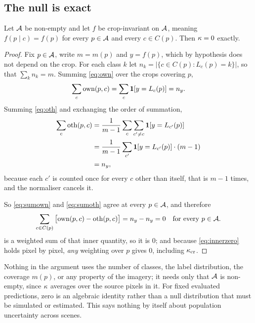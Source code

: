 \subsection{The null is exact}

\begin{proposition}
\label{prop:null}
Let $\mathcal{A}$ be non-empty and let $f$ be crop-invariant on $\mathcal{A}$, meaning
$f(p \mid c) = f(p)$ for every $p \in \mathcal{A}$ and every $c \in C(p)$. Then
$\kappa = 0$ exactly.
\end{proposition}

\begin{proof}
Fix $p \in \mathcal{A}$, write $m = m(p)$ and $y = f(p)$, which by hypothesis does not depend
on the crop. For each class $k$ let $n_k = |\{ c \in C(p) : L_c(p) = k \}|$, so that
$\sum_k n_k = m$. Summing \cref{eq:own} over the crops covering $p$,
\begin{equation}
\sum_{c} \mathrm{own}(p,c) = \sum_{c} \mathbf{1}\!\left[ y = L_c(p) \right] = n_y .
\label{eq:sumown}
\end{equation}
Summing \cref{eq:oth} and exchanging the order of summation,
\begin{align}
\sum_{c} \mathrm{oth}(p,c)
  &= \frac{1}{m-1} \sum_{c} \sum_{c' \neq c} \mathbf{1}\!\left[ y = L_{c'}(p) \right] \nonumber \\
  &= \frac{1}{m-1} \sum_{c'} \mathbf{1}\!\left[ y = L_{c'}(p) \right] \cdot (m-1) \nonumber \\
  &= n_y ,
\label{eq:sumoth}
\end{align}
because each $c'$ is counted once for every $c$ other than itself, that is $m-1$
times, and the normaliser cancels it.

So \cref{eq:sumown} and \cref{eq:sumoth} agree at every $p \in \mathcal{A}$, and therefore
\begin{equation}
\sum_{c \in C(p)} \big[ \mathrm{own}(p,c) - \mathrm{oth}(p,c) \big] = n_y - n_y = 0
\quad \text{for every } p \in \mathcal{A} .
\label{eq:innerzero}
\end{equation}
 is a weighted sum of that inner quantity, so it is $0$; and because
\cref{eq:innerzero} holds pixel by pixel, \emph{any} weighting over $p$ gives $0$,
including $\kappa_{\mathrm{cr}}$.
\end{proof}

Nothing in the argument uses the number of classes, the label distribution, the
coverage $m(p)$, or any property of the imagery; it needs only that $\mathcal{A}$ is
non-empty, since $\kappa$ averages over the source pixels in it. For fixed evaluated
predictions, zero is an algebraic identity rather than a null distribution that must
be simulated or estimated. This says nothing by itself about population uncertainty
across scenes.

